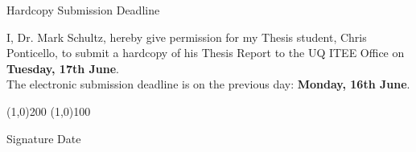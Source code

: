 \documentclass[a4paper]{article}
\begin{document}
{\huge Hardcopy Submission Deadline}

\vspace{2 cm}

\large
I, Dr. Mark Schultz, hereby give permission for my Thesis student, Chris Ponticello, to submit a hardcopy of his Thesis Report to the UQ ITEE Office on \textbf{Tuesday, 17th June}.
\\

The electronic submission deadline is on the previous day: \textbf{Monday, 16th June}.
\\

\vspace{2 cm}

\line(1,0){200} \hspace{1 cm} \line(1,0){100}

Signature \hspace{6.5 cm} Date
\end{document}
